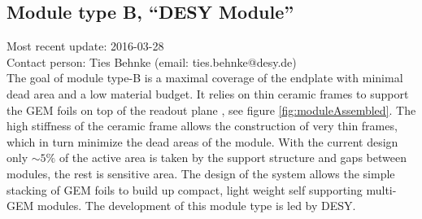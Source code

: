 \subsection{Module type B, ``DESY Module''}
\label{chap:TPC_sec:DESY_gems}
Most recent update: 2016-03-28 \\
Contact person: Ties Behnke (email: ties.behnke@desy.de)\\

The goal of module type-B is a maximal coverage of the endplate with minimal dead area and a low material budget. It relies on thin ceramic frames to support the GEM foils on top of the readout plane \cite{Hallermann:2010zz,2012arXiv1202.6510D}, see figure \ref{fig:moduleAssembled}. The high stiffness of the ceramic frame allows the construction of very thin frames, which in turn minimize the dead areas of the module. With the current design only $\sim5\%$ of the active area is taken by the support structure and gaps between modules, the rest is sensitive area. The design of the system allows the simple stacking of GEM foils to build up compact, light weight self supporting multi-GEM modules. The development of this module type is led by DESY.

